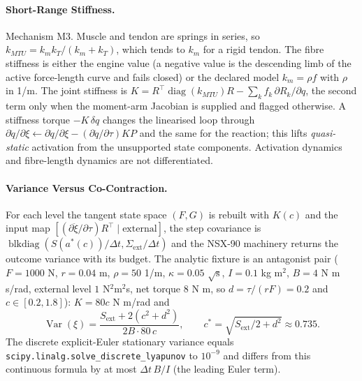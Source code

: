 \documentclass[11pt,a4paper]{article}
\begin{document}
\paragraph{Short-Range Stiffness.}  Mechanism M3.  Muscle and tendon are springs
in series, so $k_{MTU}=k_mk_T/(k_m+k_T)$, which tends to $k_m$ for a rigid
tendon.  The fibre stiffness is either the engine value (a negative value is the
descending limb of the active force-length curve and fails closed) or the
declared model $k_m=\rho f$ with $\rho$ in 1/m.  The joint stiffness is
$K=R^{\top}\operatorname{diag}(k_{MTU})R-\sum_kf_k\,\partial R_k/\partial q$,
the second term only when the moment-arm Jacobian is supplied and flagged
otherwise.  A stiffness torque $-K\,\delta q$ changes the linearised loop
through $\partial\ddot q/\partial\xi\leftarrow\partial\ddot q/\partial\xi-
(\partial\ddot q/\partial\tau)KP$ and the same for the reaction; this lifts
\emph{quasi-static} activation from the unsupported state components.
Activation dynamics and fibre-length dynamics are not differentiated.

\paragraph{Variance Versus Co-Contraction.}  For each level the tangent state
space $(F,G)$ is rebuilt with $K(c)$ and the input map
$[(\partial\ddot\xi/\partial\tau)R^{\top}\;|\;\text{external}]$, the step
covariance is $\operatorname{blkdiag}(S(a^*(c))/\Delta t,\Sigma_{\mathrm{ext}}/\Delta t)$
and the NSX-90 machinery returns the outcome variance with its budget.  The
analytic fixture is an antagonist pair ($F=1000$ N, $r=0.04$ m,
$\rho=50$ 1/m, $\kappa=0.05$ $\sqrt{\mathrm{s}}$, $I=0.1$ kg m$^2$,
$B=4$ N m s/rad, external level $1$ N$^2$m$^2$s, net torque $8$ N m, so
$d=\tau/(rF)=0.2$ and $c\in[0.2,1.8]$): $K=80c$ N m/rad and
\begin{equation}
\operatorname{Var}(\xi)=\frac{S_{\mathrm{ext}}+2(c^2+d^2)}{2B\cdot80\,c},
\qquad c^*=\sqrt{S_{\mathrm{ext}}/2+d^2}\approx0.735 .
\end{equation}
The discrete explicit-Euler stationary variance equals
\texttt{scipy.linalg.solve\_discrete\_lyapunov} to $10^{-9}$ and differs from
this continuous formula by at most $\Delta t\,B/I$ (the leading Euler term).
\end{document}
